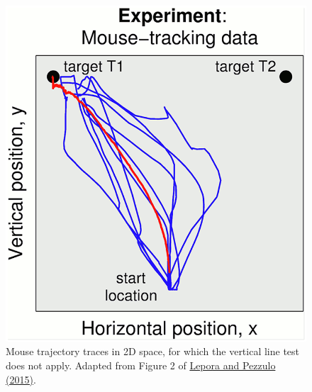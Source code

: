 \documentclass[letterpaper, 12pt]{article}
\begin{document}
\begin{figure}[h!tbp]
    \centering
    \includegraphics[width=\textwidth]{img/vertical_line/pcbi.1004110.g002.png}
    \caption*{Mouse trajectory traces in 2D space, for which the vertical line test does not apply. Adapted from Figure 2 of \href{https://doi.org/10.1371/journal.pcbi.1004110}{Lepora and Pezzulo (2015)}.}
\end{figure}
\end{document}
